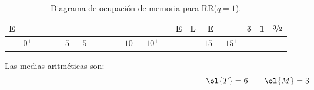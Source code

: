 \begin{ejercicio}
\begin{enumerate}
\begin{table}[H]
\begin{tabular}{ccccccccccccccccc|ccc}
            \multicolumn{1}{c|}{\textbf{E}} &                        &                                &                                &                                &                        &                        &                                &                                &                                &                         &                         &                                & E                              & L                              & E                       &    & 3          & 1          & $\nicefrac{3}{2}$        \\ \hline
            \multicolumn{1}{c|}{}           & \multicolumn{1}{c|}{$0^+$} & \multicolumn{1}{c|}{\textit{}} & \multicolumn{1}{c|}{\textit{}} & \multicolumn{1}{c|}{\textit{}} & \multicolumn{1}{c|}{$5^-$} & \multicolumn{1}{c|}{$5^+$} & \multicolumn{1}{c|}{\textit{}} & \multicolumn{1}{c|}{\textit{}} & \multicolumn{1}{c|}{\textit{}} & \multicolumn{1}{c|}{$10^-$} & \multicolumn{1}{c|}{$10^+$} & \multicolumn{1}{c|}{\textit{}} & \multicolumn{1}{c|}{\textit{}} & \multicolumn{1}{c|}{\textit{}} & \multicolumn{1}{c|}{$15^-$} & $15^+$ &            &            &           
            \end{tabular}
            \caption{Diagrama de ocupación de memoria para RR($q=1$).}
        \end{table}

        Las medias aritméticas son:
        \begin{equation*}
            \ol{T} = 6 \qquad \ol{M}=3
        \end{equation*}


\end{enumerate}
\end{ejercicio}
